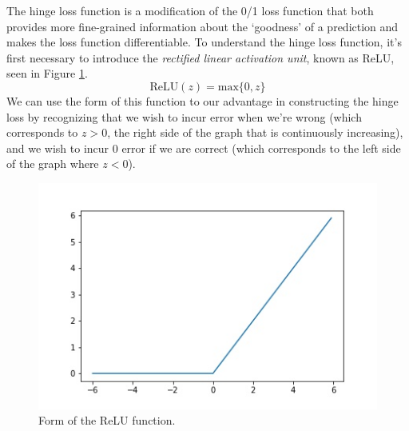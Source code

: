 The hinge loss function is a modification of the 0/1 loss function that both provides more fine-grained information about the `goodness' of a prediction and makes the loss function differentiable. To understand the hinge loss function, it's first necessary to introduce the \textit{rectified linear activation unit}, known as ReLU, seen in Figure \ref{fig:relu-fn}.
\begin{equation}
	\text{ReLU}(z) = \text{max}\{0, z\}
\end{equation}
We can use the form of this function to our advantage in constructing the hinge loss by recognizing that we wish to incur error when we're wrong (which corresponds to $z > 0$, the right side of the graph that is continuously increasing), and we wish to incur 0 error if we are correct (which corresponds to the left side of the graph where $z < 0$).
\begin{figure}
    \centering
    \includegraphics[width=0.5\paperwidth]{../Classification/fig/relu_fn_GEN.jpg}
    \caption{Form of the ReLU function.}
    \label{fig:relu-fn}
\end{figure}

